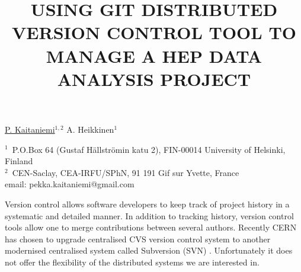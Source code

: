 \documentclass[12pt]{article}
\begin{document}
\title{USING GIT DISTRIBUTED VERSION CONTROL TOOL TO MANAGE A HEP DATA ANALYSIS PROJECT}
\underline{P. Kaitaniemi}$^{1, 2}$ A. Heikkinen$^1$ 

$^1$~P.O.Box 64 (Gustaf H\"allstr\"omin katu 2), FIN-00014 University of Helsinki, Finland\\
$^2$~CEN-Saclay, CEA-IRFU/SPhN, 91 191 Gif sur Yvette, France \\
email: pekka.kaitaniemi@gmail.com

\vspace{\baselineskip}

Version control allows software developers to keep track of project history in
a systematic and detailed manner. 
In addition to tracking history, version control tools allow
one to merge contributions between several authors.
Recently CERN has chosen to upgrade centralised CVS version control
system \cite{cernsvn} to another modernised centralised system called Subversion (SVN) \cite{svnsite}.
Unfortunately it does not offer the flexibility of the
distributed systems we are interested in. 

\end{document}
